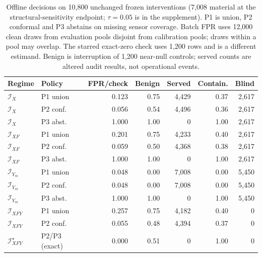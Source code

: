 \begin{table}[!t]
\caption{Offline decisions on 10,800 unchanged frozen interventions (7,008 material at the structural-sensitivity endpoint; $\tau=0.05$ is in the supplement). P1 is union, P2 conformal and P3 abstains on missing sensor coverage. Batch FPR uses 12,000 clean draws from evaluation pools disjoint from calibration pools; draws within a pool may overlap. The starred exact-zero check uses 1,200 rows and is a different estimand. Benign is interruption of 1,200 near-null controls; served counts are altered audit results, not operational events.}
\label{tab:policy}
\centering\scriptsize\setlength{\tabcolsep}{2pt}
\begin{tabular}{@{}llrrrrr@{}}
\toprule
Regime & Policy & FPR/check & Benign & Served & Contain. & Blind \\
\midrule
$\mathcal I_X$ & P1 union & 0.123 & 0.75 & 4,429 & 0.37 & 2,617 \\
$\mathcal I_X$ & P2 conf. & 0.056 & 0.54 & 4,496 & 0.36 & 2,617 \\
$\mathcal I_X$ & P3 abst. & 1.000 & 1.00 & 0 & 1.00 & 2,617 \\
\addlinespace[1pt]
$\mathcal I_{XF}$ & P1 union & 0.201 & 0.75 & 4,233 & 0.40 & 2,617 \\
$\mathcal I_{XF}$ & P2 conf. & 0.059 & 0.50 & 4,368 & 0.38 & 2,617 \\
$\mathcal I_{XF}$ & P3 abst. & 1.000 & 1.00 & 0 & 1.00 & 2,617 \\
\addlinespace[1pt]
$\mathcal I_{Y_m}$ & P1 union & 0.048 & 0.00 & 7,008 & 0.00 & 5,450 \\
$\mathcal I_{Y_m}$ & P2 conf. & 0.048 & 0.00 & 7,008 & 0.00 & 5,450 \\
$\mathcal I_{Y_m}$ & P3 abst. & 1.000 & 1.00 & 0 & 1.00 & 5,450 \\
\addlinespace[1pt]
$\mathcal I_{XFY}$ & P1 union & 0.257 & 0.75 & 4,182 & 0.40 & 0 \\
$\mathcal I_{XFY}$ & P2 conf. & 0.055 & 0.48 & 4,394 & 0.37 & 0 \\
\addlinespace[1pt]
$\mathcal I_{XFY}^{\star}$ & P2/P3 (exact) & 0.000 & 0.51 & 0 & 1.00 & 0 \\
\bottomrule
\end{tabular}
\end{table}
